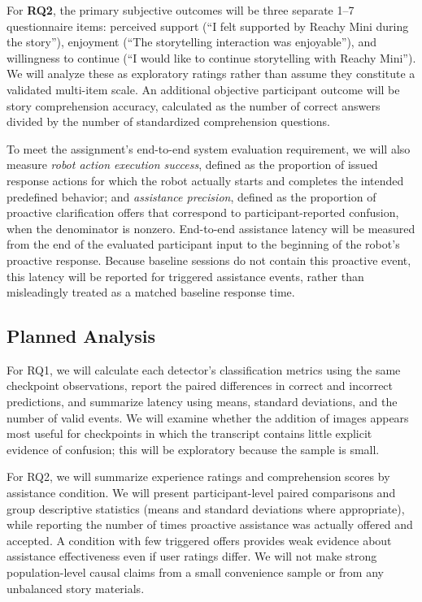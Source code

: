 \documentclass[conference]{IEEEtran}
\begin{document}
For \textbf{RQ2}, the primary subjective outcomes will be three separate 1--7 questionnaire items: perceived support (``I felt supported by Reachy Mini during the story''), enjoyment (``The storytelling interaction was enjoyable''), and willingness to continue (``I would like to continue storytelling with Reachy Mini''). We will analyze these as exploratory ratings rather than assume they constitute a validated multi-item scale. An additional objective participant outcome will be story comprehension accuracy, calculated as the number of correct answers divided by the number of standardized comprehension questions.

To meet the assignment's end-to-end system evaluation requirement, we will also measure \emph{robot action execution success}, defined as the proportion of issued response actions for which the robot actually starts and completes the intended predefined behavior; and \emph{assistance precision}, defined as the proportion of proactive clarification offers that correspond to participant-reported confusion, when the denominator is nonzero. End-to-end assistance latency will be measured from the end of the evaluated participant input to the beginning of the robot's proactive response. Because baseline sessions do not contain this proactive event, this latency will be reported for triggered assistance events, rather than misleadingly treated as a matched baseline response time.

\subsection{Planned Analysis}
For RQ1, we will calculate each detector's classification metrics using the same checkpoint observations, report the paired differences in correct and incorrect predictions, and summarize latency using means, standard deviations, and the number of valid events. We will examine whether the addition of images appears most useful for checkpoints in which the transcript contains little explicit evidence of confusion; this will be exploratory because the sample is small.

For RQ2, we will summarize experience ratings and comprehension scores by assistance condition. We will present participant-level paired comparisons and group descriptive statistics (means and standard deviations where appropriate), while reporting the number of times proactive assistance was actually offered and accepted. A condition with few triggered offers provides weak evidence about assistance effectiveness even if user ratings differ. We will not make strong population-level causal claims from a small convenience sample or from any unbalanced story materials.
\end{document}
